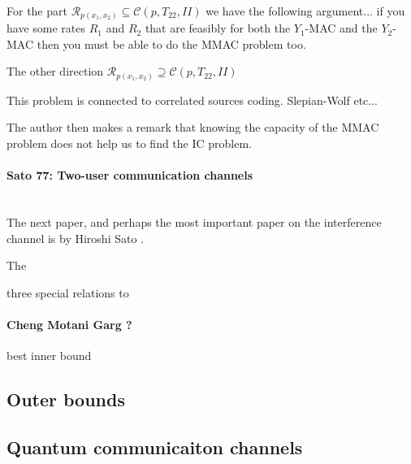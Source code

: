 \documentclass[aps,11pt,twoside,letterpaper]{article}
\theoremstyle{plain}
\theoremstyle{definition}
\begin{document}
         \\
        For the part $\mathcal{R}_{p(x_1,x_2)} \subseteq \mathcal{C}(p,T_{22},II)$ we have the following argument...
        if you have some rates $R_1$ and $R_2$ that are feasibly for both the $Y_1$-MAC and the $Y_2$-MAC then
        you must be able to do the MMAC problem too.
        
        The other direction $\mathcal{R}_{p(x_1,x_2)} \supseteq \mathcal{C}(p,T_{22},II)$  



        This problem is connected to correlated sources coding. Slepian-Wolf etc...


        The author then makes a remark that knowing the capacity of the MMAC problem
        does not help us to find the IC problem.
        




        \paragraph{Sato 77: Two-user communication channels} \ \\

        The next paper, and perhaps the most important paper on the interference channel is
        by Hiroshi Sato \cite{Sato77}.

        The 
        
        three special relations to 

        \paragraph{Cheng Motani Garg ?}

        best inner bound



    \subsection{Outer bounds}





    \subsection{Quantum communicaiton channels}
\end{document}
